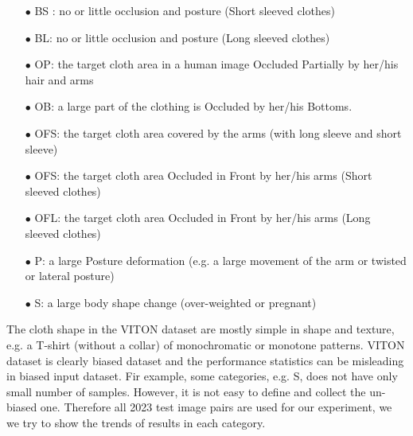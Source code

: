 
\begin{itemize}

\item[$\bullet$] BS : no or little occlusion and posture (Short sleeved clothes)
\item[$\bullet$] BL: no or little occlusion and posture (Long sleeved clothes)
\item[$\bullet$] OP: the target cloth area in a human image Occluded Partially by her/his hair and arms
\item[$\bullet$] OB: a large part of the clothing is Occluded by her/his Bottoms.
\item[$\bullet$] OFS: the target cloth area covered by the arms (with long sleeve and short sleeve)
\item[$\bullet$] OFS: the target cloth area Occluded in Front by her/his arms (Short sleeved clothes)
\item[$\bullet$] OFL: the target cloth area Occluded in Front by her/his arms (Long sleeved clothes)

\item[$\bullet$] P:  a large Posture deformation (e.g. a large movement of the arm or twisted or lateral posture)
\item[$\bullet$] S:  a large body shape change  (over-weighted or pregnant)

\end{itemize}

The cloth shape in the VITON dataset are mostly simple in shape and texture, e.g. a T-shirt (without a collar) of  monochromatic or monotone patterns. VITON dataset is clearly biased dataset and the performance statistics can be misleading in biased input dataset. Fir example, some categories, e.g. S, does not have only small number of samples. However, it is not easy to define and collect the un-biased one. Therefore all 2023 test image pairs are used for our experiment, we we try to show the trends of results in each category.


